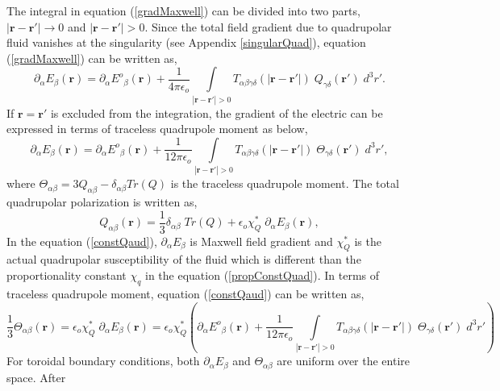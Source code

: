 The integral in equation (\ref{gradMaxwell}) can be divided into two parts, $|\textbf{r}-\textbf{r}'|\rightarrow 0 $ and $|\textbf{r}-\textbf{r}'|> 0$. Since the total
field gradient due to quadrupolar fluid vanishes at the singularity (see Appendix \ref{singularQuad}), equation (\ref{gradMaxwell}) can be written as,
\begin{equation}
\partial_\alpha E_\beta(\textbf{r}) = \partial_\alpha {E^o}_\beta(\textbf{r}) +
  \frac{1}{4\pi \epsilon_o}\int\limits_{|\textbf{r}-\textbf{r}'|> 0 }
  T_{\alpha\beta\gamma\delta}(|\textbf{r}-\textbf{r}'|)\;{Q}_{\gamma\delta}(\textbf{r}')\;
  d^3r'. 
\end{equation}
If $\textbf{r} = \textbf{r}'$ is excluded from the integration, the gradient of the electric can be expressed in terms of traceless quadrupole moment as below, \cite{LoganI81}
\begin{equation}
\partial_\alpha E_\beta(\textbf{r}) = \partial_\alpha {E^o}_\beta(\textbf{r}) + \frac{1}{12\pi \epsilon_o}\int\limits_{|\textbf{r}-\textbf{r}'|> 0 } T_{\alpha\beta\gamma\delta}(|\textbf{r}-\textbf{r}'|)\;{\Theta}_{\gamma\delta}(\textbf{r}')\; d^3r',
\end{equation}
where $\Theta_{\alpha\beta} = 3Q_{\alpha\beta} - \delta_{\alpha\beta}Tr(Q)$
is the traceless quadrupole moment. The total quadrupolar polarization is written as,
\begin{equation}
{Q}_{\alpha\beta}(\textbf{r}) =  \frac{1}{3}\delta_{\alpha\beta}\;Tr({Q})+\epsilon_o {\chi}^*_Q\;\partial_\alpha E_\beta(\textbf{r}),
\label{constQaud}
\end{equation}
In the equation (\ref{constQaud}), $\partial_{\alpha}E_{\beta}$ is Maxwell field gradient and ${\chi}^*_Q$ is the actual quadrupolar susceptibility of the fluid which is different than the proportionality constant $\chi_q $ in the equation (\ref{propConstQuad}). In terms of traceless quadrupole moment, equation (\ref{constQaud}) can be written as,
\begin{equation}
\frac{1}{3}{\Theta}_{\alpha\beta}(\textbf{r}) =  \epsilon_o {\chi}^*_Q \; \partial_\alpha E_\beta (\textbf{r})=  \epsilon_o {\chi}^*_Q \left(\partial_\alpha {E^o}_\beta(\textbf{r}) + \frac{1}{12\pi \epsilon_o}\int\limits_{|\textbf{r}-\textbf{r}'|> 0 } T_{\alpha\beta\gamma\delta}(|\textbf{r}-\textbf{r}'|)\;{\Theta}_{\gamma\delta}(\textbf{r}')\; d^3r'\right)
\end{equation}
For toroidal boundary conditions, both $\partial_\alpha E_\beta$ and
${\Theta}_{\alpha\beta}$ are uniform over the entire space. After
